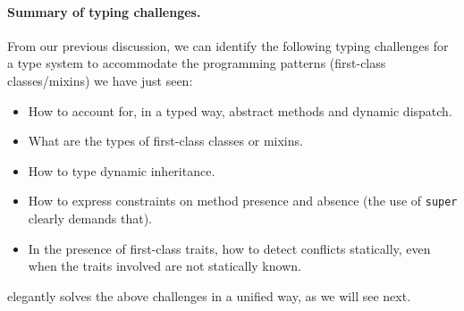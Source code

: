 \paragraph{Summary of typing challenges.}
From our previous discussion, we can identify the following typing challenges
for a type system to accommodate the programming patterns (first-class classes/mixins)
we have just seen:
\begin{itemize}
\item How to account for, in a typed way, abstract methods and dynamic dispatch.
\item What are the types of first-class classes or mixins.
\item How to type dynamic inheritance.
\item How to express constraints on method presence and absence (the use of
  \lstinline{super} clearly demands that).
\item In the presence of first-class traits, how to detect conflicts statically,
  even when the traits involved are not statically known.
\end{itemize}
\sedel elegantly solves the above challenges in a unified way, as
we will see next.




